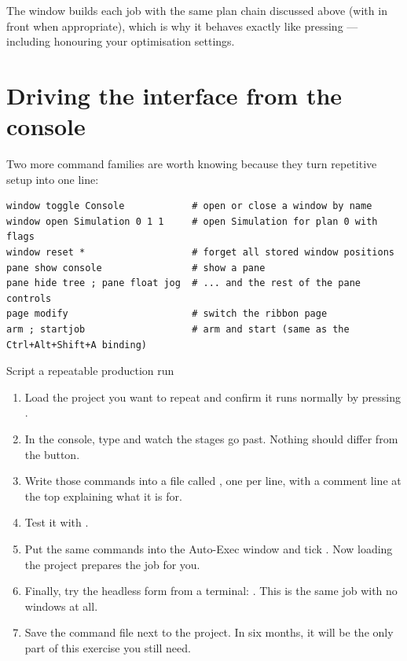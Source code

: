 \noindent The window builds each job with the same plan chain discussed above
(with  in front when appropriate), which is why it behaves exactly
like pressing  --- including honouring your optimisation settings.

\section{Driving the interface from the console}

Two more command families are worth knowing because they turn repetitive setup
into one line:

\begin{lstlisting}[style=konsole]
window toggle Console            # open or close a window by name
window open Simulation 0 1 1     # open Simulation for plan 0 with flags
window reset *                   # forget all stored window positions
pane show console                # show a pane
pane hide tree ; pane float jog  # ... and the rest of the pane controls
page modify                      # switch the ribbon page
arm ; startjob                   # arm and start (same as the Ctrl+Alt+Shift+A binding)
\end{lstlisting}

\begin{tryit}{Script a repeatable production run}
\begin{enumerate}[label=\arabic*.,leftmargin=1.4em]
  \item Load the project you want to repeat and confirm it runs normally by
        pressing .
  \item In the console, type  and watch the stages go past. Nothing should
        differ from the button.
  \item Write those commands into a file called , one per line,
        with a comment line at the top explaining what it is for.
  \item Test it with .
  \item Put the same commands into the Auto-Exec window and tick
        . Now loading the project prepares the job for you.
  \item Finally, try the headless form from a terminal: . This is the same job with no
        windows at all.
  \item Save the command file next to the project. In six months, it will be the
        only part of this exercise you still need.
\end{enumerate}
\end{tryit}
